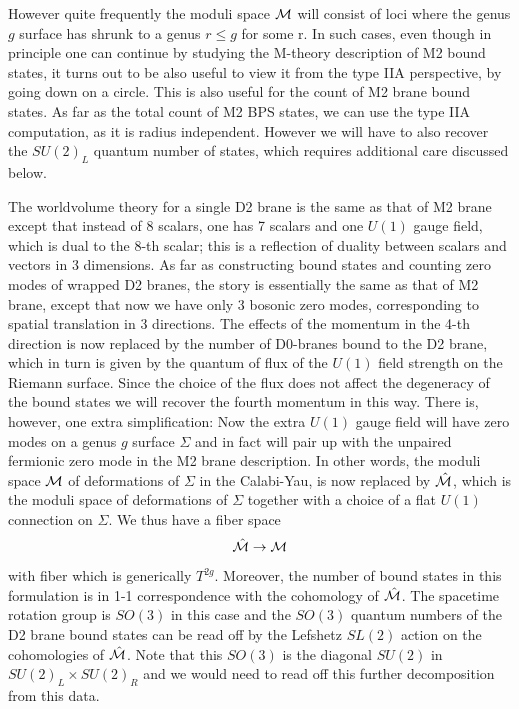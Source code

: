 However quite frequently the moduli space ${\cal M}$ will consist
of loci where the genus $g$ surface has shrunk to a genus $r\leq g$
for some r.  In such cases, even though in principle one can
continue by studying the M-theory description of M2 bound states,
it turns out to be also useful to view it from the type IIA perspective,
by going down on a circle.  This is also useful
for the count of M2 brane bound states.
 As far as the total count of M2 BPS states, we can use the type IIA
computation, as it is radius independent.
However we will have to also recover
the $SU(2)_L$ quantum number of states, which requires additional
care discussed below.

The worldvolume theory for a single D2 brane is the same
as that of M2 brane except that instead of 8 scalars, one has 7
scalars and one $U(1)$ gauge field, which is dual to the 8-th
scalar; this is a reflection of duality between scalars and vectors
in 3 dimensions.  As far as constructing bound states and counting
zero modes of wrapped D2 branes, the story is essentially the same as that of
M2 brane, except that now we have only 3 bosonic zero modes, corresponding
to spatial translation in 3 directions.  The effects of the momentum
in the 4-th direction is now replaced by the number of D0-branes
bound to the D2 brane, which in turn is given by the quantum of
flux of the $U(1)$
field strength on the Riemann surface.  Since the choice of the flux
does not affect the degeneracy of the bound states we will recover
the fourth momentum in this way.  There is, however, one extra simplification:
Now the extra $U(1)$ gauge field will have zero modes on a genus $g$
surface $\Sigma$ and in fact will pair up with the unpaired fermionic
zero mode in the M2 brane description.  In other words,
the moduli space ${\cal M}$ of deformations of $\Sigma$
in the Calabi-Yau, is now replaced by $\hat{\cal M}$, which
is the moduli space of deformations of $\Sigma$ together with a choice
of a flat $U(1)$ connection on $\Sigma$.  We thus have a fiber space
%
$${\hat{\cal M}}\rightarrow {\cal M}$$
%
with fiber which is generically $T^{2g}$.
 Moreover, the number
of bound states in this formulation is in 1-1 correspondence
with the cohomology of $\hat {\cal M}$. The
spacetime rotation group is $SO(3)$ in this case
and the $SO(3)$ quantum numbers of the D2 brane bound states
can be read off by the Lefshetz $SL(2)$ action
on the cohomologies of $\hat {\cal M}$.  Note that
this $SO(3)$ is the diagonal
$SU(2)$ in $SU(2)_L\times SU(2)_R$ and we would need
to read off this further decomposition from this data.

